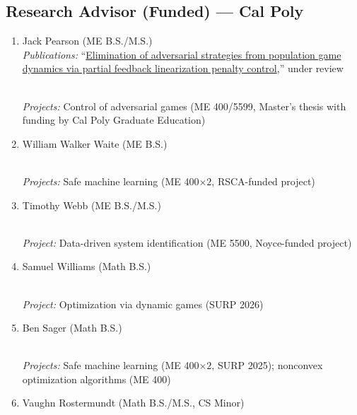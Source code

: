 \subsection{Research Advisor (Funded) --- Cal Poly}
\begin{enumerate}[label=\arabic*.]
	\item Jack Pearson (ME B.S./M.S.)  \\
	\textit{Publications:} ``\href{https://brendon-anderson.github.io/files/publications/pearson2026elimination-long.pdf}{Elimination of adversarial strategies from population game dynamics via partial feedback linearization penalty control},'' under review
	\begin{student-projects}
		\\ \textit{Projects:} Control of adversarial games (ME 400/5599, Master's thesis with funding by Cal Poly Graduate Education)
	\end{student-projects}
	\item William Walker Waite (ME B.S.) 
	\begin{student-projects}
		\\ \textit{Projects:} Safe machine learning (ME 400$\times 2$, RSCA-funded project)
	\end{student-projects}
	\item Timothy Webb (ME B.S./M.S.) 
	\begin{student-projects}
		\\ \textit{Project:} Data-driven system identification (ME 5500, Noyce-funded project)
	\end{student-projects}
	\item Samuel Williams (Math B.S.) 
	\begin{student-projects}
		\\ \textit{Project:} Optimization via dynamic games (SURP 2026)
	\end{student-projects}
	\item Ben Sager (Math B.S.) 
	\begin{student-projects}
		\\ \textit{Projects:} Safe machine learning (ME 400$\times 2$, SURP 2025); nonconvex optimization algorithms (ME 400)
	\end{student-projects}
	\item Vaughn Rostermundt (Math B.S./M.S., CS Minor)  \\

\end{enumerate}
